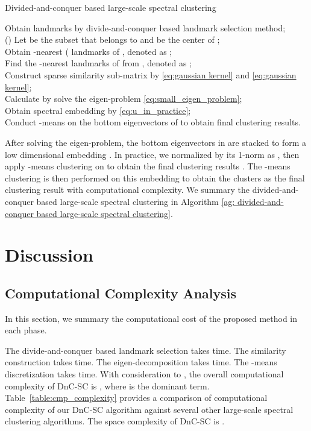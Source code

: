 \documentclass[a4paper,fleqn]{cas-dc}
\begin{document}
\begin{algorithm}
  \label{ag: divided-and-conquer based large-scale spectral clustering}
  \caption{Divided-and-conquer based large-scale spectral clustering}
  \SetAlgoLined
  Obtain  landmarks by divide-and-conquer based landmark selection method;\\
\ForEach(){}{
Let  be the subset that  belongs to and  be the center of ;\\
     Obtain -nearest ( landmarks of , denoted as ;\\
     Find the -nearest landmarks of  from , denoted as ;\\
    }
  Construct sparse similarity sub-matrix by \eqref{eq:gaussian kernel} and \eqref{eq:gaussian kernel};\\
  Calculate  by solve the eigen-problem \eqref{eq:small_eigen_problem};\\
  Obtain spectral embedding  by \eqref{eq:u_in_practice};\\
  Conduct -means on the bottom  eigenvectors of  to obtain final clustering results.
\end{algorithm}


After solving the eigen-problem, the  bottom eigenvectors in  are stacked to form a low dimensional embedding .
In practice, we normalized  by its 1-norm as , then apply -means clustering on  to obtain the final clustering results \cite{ng2002spectral}.
The -means clustering is then performed on this embedding to obtain the  clusters as the final clustering result with  computational complexity.
We summary the divided-and-conquer based large-scale spectral clustering in Algorithm \ref{ag: divided-and-conquer based large-scale spectral clustering}. 
\section{Discussion}

\subsection{Computational Complexity Analysis}
\label{sec:dnc-sc_complexity}
In this section, we summary the computational cost of the proposed method in each phase.

The divide-and-conquer based landmark selection takes  time. The similarity construction takes  time. The eigen-decomposition takes  time. The -means discretization takes  time. With consideration to , the overall computational complexity of DnC-SC is , where  is the dominant term. Table~\ref{table:cmp_complexity} provides a comparison of computational complexity of our DnC-SC algorithm against several other large-scale spectral clustering algorithms.
The space complexity of DnC-SC is .
\end{document}
